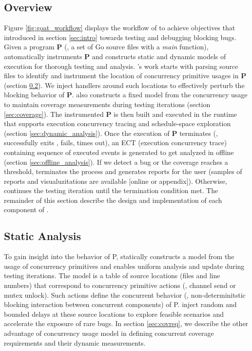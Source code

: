 %
\subsection{Overview}
\label{sec:overview}
Figure \ref{fig:goat_workflow} displays the workflow of \goat to achieve objectives that introduced in section \ref{sec:intro} towards testing and debugging blocking bugs.
%
Given a program \textbf{P} (\ie, a set of Go source files with a \textit{main} function), \goat automatically instruments \textbf{P} and constructs static and dynamic models of execution for thorough testing and analysis.
%
\goat's work starts with parsing source files to identify and instrument the location of concurrency primitive usages in \textbf{P} (section \ref{sec:static_analysis}).
%
We inject \goat handlers around such locations to effectively perturb the blocking behavior of \textbf{P}.
%
\goat also constructs a fixed model from the concurrency usage to maintain coverage measurements during testing iterations (section \ref{sec:coverage}).
%
The instrumented \textbf{P} is then built and executed in the \goat runtime that supports execution concurrency tracing and schedule-space exploration (section \ref{sec:dynamic_analysis}).
%
Once the execution of \textbf{P} terminates (\eg, successfully exits , fails, times out), an ECT (execution concurrency trace) containing sequence of executed events is generated to get analyzed in offline (section \ref{sec:offline_analysis}).
%
If we detect a bug or the coverage reaches a threshold, \goat terminates the process and generates reports for the user (samples of reports and visualuzitations are available [online or appendix]). Otherwise, \goat continues the testing iteration until the termination condition met.
%
The remainder of this section describe the design and implementation of each component of \goat.

\subsection{Static Analysis}
\label{sec:static_analysis}
To gain insight into the behavior of P, \goat statically constructs a model from the usage of concurrency primitives and enables uniform analysis and update during testing iterations.
%
The model is a table of source locations (files and line numbers) that correspond to concurrency primitive actions (\eg, channel send or mutex unlock).
%
Such actions define the concurrent behavior (\ie, non-determinitstic blocking interaction between concurrent components) of P.
%
\goat inject random and bounded delays at these source locations to explore feasible scenarios and accelerate the exposure of rare bugs.
%
In section \ref{sec:covreq}, we describe the other advantage of concurrency usage model in defining concurrent coverage requirements and their dynamic measurements.
%

